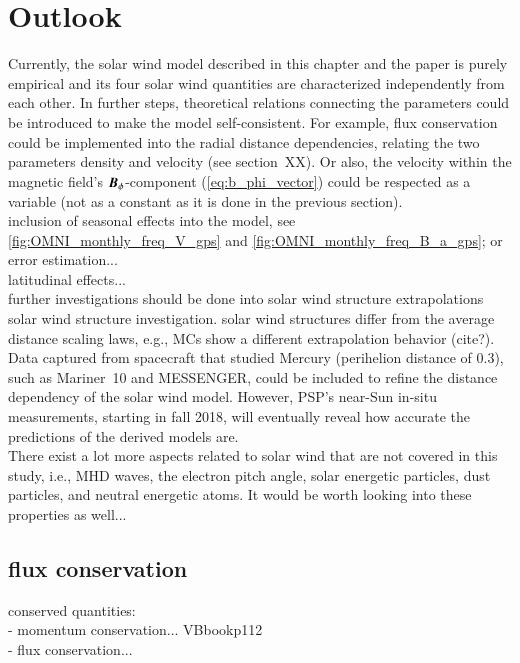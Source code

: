 \section{Outlook}
Currently, the solar wind model described in this chapter and the paper is purely empirical and its four solar wind quantities are characterized independently from each other. In further steps, theoretical relations connecting the parameters could be introduced to make the model self-consistent. For example, flux conservation could be implemented into the radial distance dependencies, relating the two parameters density and velocity (see section~XX). Or also, the velocity within the magnetic field's $\boldsymbol{B}_\phi$-component (\autoref{eq:b_phi_vector}) could be respected as a variable (not as a constant as it is done in the previous section).\\

inclusion of seasonal effects into the model, see \autoref{fig:OMNI_monthly_freq_V_gps} and \autoref{fig:OMNI_monthly_freq_B_a_gps}; or error estimation...\\

latitudinal effects...\\

further investigations should be done into solar wind structure extrapolations\\
solar wind structure investigation. solar wind structures differ from the average distance scaling laws, e.g., MCs show a different extrapolation behavior (cite?).\\

Data captured from spacecraft that studied Mercury (perihelion distance of \SI{0.3}{\au}), such as Mariner~10 and MESSENGER, could be included to refine the distance dependency of the solar wind model.
However, PSP's near-Sun in-situ measurements, starting in fall 2018, will eventually reveal how accurate the predictions of the derived models are.\\

There exist a lot more aspects related to solar wind that are not covered in this study, i.e., MHD waves, the electron pitch angle, solar energetic particles, dust particles, and neutral energetic atoms. It would be worth looking into these properties as well...\\


\subsection{flux conservation}
conserved quantities:\\
- momentum conservation... VBbookp112\\
- flux conservation...\\

